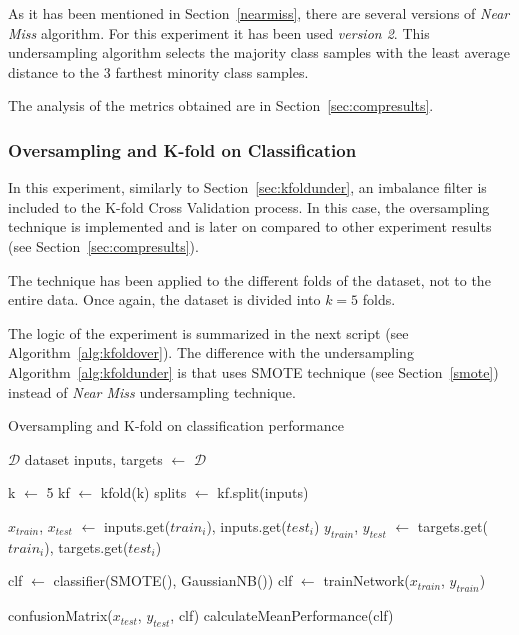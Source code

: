 As it has been mentioned in Section~\ref{nearmiss}, there are several versions
of \textit{Near Miss} algorithm. For this experiment it has been used 
\textit{version 2}. This undersampling algorithm selects the majority class
samples with the least average distance to the 3 farthest minority class 
samples.

The analysis of the metrics obtained are in Section~\ref{sec:compresults}.

\subsubsection{Oversampling and K-fold on Classification}

In this experiment, similarly to Section~\ref{sec:kfoldunder}, an imbalance 
filter is included to the K-fold Cross Validation process. In this case, the 
oversampling technique is implemented and is later on compared to other 
experiment results (see Section~\ref{sec:compresults}).

The technique has been applied to the different folds of the dataset, not to 
the entire data. Once again, the dataset is divided into $k=5$ folds. 

The logic of the experiment is summarized in the next script (see 
Algorithm~\ref{alg:kfoldover}). The difference with the
undersampling Algorithm~\ref{alg:kfoldunder} is that uses SMOTE technique (see 
Section~\ref{smote}) instead of \textit{Near Miss} undersampling technique.

\begin{breakablealgorithm}
    \caption{Oversampling and K-fold on classification performance}
    \footnotesize
    \label{alg:kfoldover}
    \begin{algorithmic}[1]
        \Require $\mathcal{D}$ dataset
        \State inputs, targets $\leftarrow$ $\mathcal{D}$
    
        \State k $\leftarrow$ 5
        \State kf $\leftarrow$ kfold(k)
        \State splits $\leftarrow$ kf.split(inputs)
        
        	\State $x_{train}$, $x_{test}$ $\leftarrow$ inputs.get($train_{i}$), inputs.get($test_{i}$)
        	\State $y_{train}$, $y_{test}$ $\leftarrow$ targets.get($train_{i}$), targets.get($test_{i}$)
        	
        	\State clf $\leftarrow$ classifier(SMOTE(), GaussianNB())
        	\State clf $\leftarrow$ trainNetwork($x_{train}$, $y_{train}$)
        	
        	\State confusionMatrix($x_{test}$, $y_{test}$, clf)
        \EndFor
        \State calculateMeanPerformance(clf)
    \end{algorithmic}
\end{breakablealgorithm}

